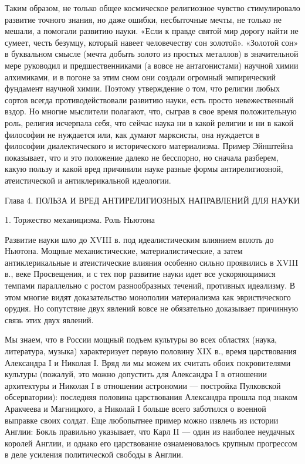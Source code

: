 Таким  образом,  не  только   общее  космическое  религиозное  чувство
стимулировало  развитие точного  знания, но  даже ошибки,  несбыточные
мечты, не только не мешали, а  помогали развитию науки. «Если к правде
святой  мир дорогу  найти  не сумеет,  честь  безумцу, который  навеет
человечеству сон  золотой». «Золотой  сон» в буквальном  смысле (мечта
добыть золото  из простых  металлов) в  значительной мере  руководил и
предшественниками (а вовсе не антагонистами) научной химии алхимиками,
и в  погоне за этим  сном они создали огромный  эмпирический фундамент
научной химии.  Поэтому утверждение  о том,  что религии  любых сортов
всегда противодействовали  развитию науки, есть  просто невежественный
вздор.  Но  многие  мыслители  полагают,  что,  сыграв  в  свое  время
положительную  роль, религия  исчерпала себя,  что сейчас  наука ни  в
какой религии  и ни  в какой  философии не  нуждается или,  как думают
марксисты, она  нуждается в философии диалектического  и исторического
материализма. Пример Эйнштейна показывает,  что и это положение далеко
не бесспорно, но сначала разберем, какую пользу и какой вред причинили
науке разные  формы антирелигиозной, атеистической  и антиклерикальной
идеологии.

Глава 4. ПОЛЬЗА И ВРЕД АНТИРЕЛИГИОЗНЫХ НАПРАВЛЕНИЙ ДЛЯ НАУКИ

1. Торжество механицизма. Роль Ньютона

Развитие науки  шло до  XVIII в.  под идеалистическим  влиянием вплоть
до  Ньютона.  Мощные   механистические,  материалистические,  а  затем
антиклерикальные и атеистические влияния  особенно сильно проявились в
XVIII  в., веке  Просвещения,  и с  тех пор  развитие  науки идет  все
ускоряющимися  темпами  параллельно  с ростом  разнообразных  течений,
противных  идеализму. В  этом  многие  видят доказательство  монополии
материализма  как эвристического  орудия. Но  сопутствие двух  явлений
вовсе не обязательно доказывает причинную связь этих двух явлений.

Мы  знаем,  что в  России  мощный  подъем  культуры во  всех  областях
(наука,  литература, музыка)  характеризует  первую  половину XIX  в.,
время  царствования Александра  I и  Николая I.  Вряд ли  мы можем  их
считать  обоих покровителями  культуры (пожалуй,  это можно  допустить
для  Александра I  в отношении  архитектуры  и Николая  I в  отношении
астрономии --- постройка  Пулковской обсерватории): последняя половина
царствования Александра  прошла под  знаком Аракчеева и  Магницкого, а
Николай I больше всего заботился  о военной выправке своих солдат. Еще
любопытнее  пример можно  извлечь из  истории Англии:  Бокль правильно
указывает, что Карл II ---  один из наиболее неудачных королей Англии,
и  однако его  царствование ознаменовалось  крупным прогрессом  в деле
усиления политической свободы в Англии.

